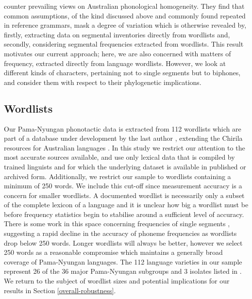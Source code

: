 \textcite{gasser_revisiting_2014} counter prevailing views on Australian phonological homogeneity. They find that common assumptions, of the kind discussed above and commonly found repeated in reference grammars, mask a degree of variation which is otherwise revealed by, firstly, extracting data on segmental inventories directly from wordlists and, secondly, considering segmental frequencies extracted from wordlists. This result motivates our current approach; here, we are also concerned with matters of frequency, extracted directly from language wordlists. However, we look at different kinds of characters, pertaining not to single segments but to biphones, and consider them with respect to their phylogenetic implications.

\hypertarget{phylo-sig-wordlists}{%
\subsection{Wordlists}\label{phylo-sig-wordlists}}

Our Pama-Nyungan phonotactic data is extracted from 112 wordlists which are part of a database under development by the last author \autocite{round_ausphon-lexicon_2017}, extending the Chirila resources for Australian languages \autocite{bowern_chirila:_2016}. In this study we restrict our attention to the most accurate sources available, and use only lexical data that is compiled by trained linguists and for which the underlying dataset is available in published or archived form. Additionally, we restrict our sample to wordlists containing a minimum of 250 words. We include this cut-off since measurement accuracy is a concern for smaller wordlists. A documented wordlist is necessarily only a subset of the complete lexicon of a language and it is unclear how big a wordlist must be before frequency statistics begin to stabilise around a sufficient level of accuracy. There is some work in this space concerning frequencies of single segments \autocite{dockum_swadesh_2019}, suggesting a rapid decline in the accuracy of phoneme frequencies as wordlists drop below 250 words. Longer wordlists will always be better, however we select 250 words as a reasonable compromise which maintains a generally broad coverage of Pama-Nyungan languages. The 112 language varieties in our sample represent 26 of the 36 major Pama-Nyungan subgroups and 3 isolates listed in \textcite{bowern_pama-nyungan_2018}. We return to the subject of wordlist sizes and potential implications for our results in Section \ref{overall-robustness}.

